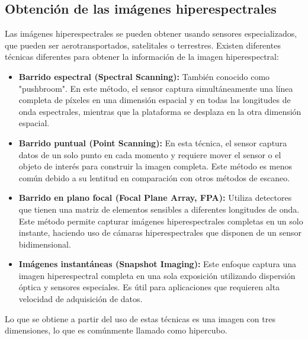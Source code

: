 \subsection{Obtención de las imágenes hiperespectrales}
Las imágenes hiperespectrales se pueden obtener usando sensores especializados, que pueden ser aerotransportados, satelitales o terrestres.
Existen diferentes técnicas diferentes para obtener la información de la imagen hiperespectral:
\begin{itemize}
    \item \textbf{Barrido espectral (Spectral Scanning):} También conocido como "pushbroom". En este método, el sensor captura simultáneamente una línea completa de píxeles en una dimensión espacial y en todas las longitudes de onda espectrales, mientras que la plataforma se desplaza en la otra dimensión espacial.

    \item \textbf{Barrido puntual (Point Scanning):} En esta técnica, el sensor captura datos de un solo punto en cada momento y requiere mover el sensor o el objeto de interés para construir la imagen completa. Este método es menos común debido a su lentitud en comparación con otros métodos de escaneo.
    
    \item \textbf{Barrido en plano focal (Focal Plane Array, FPA):} Utiliza detectores que tienen una matriz de elementos sensibles a diferentes longitudes de onda. Este método permite capturar imágenes hiperespectrales completas en un solo instante, haciendo uso de cámaras hiperespectrales que disponen de un sensor bidimensional.
    
    \item \textbf{Imágenes instantáneas (Snapshot Imaging):} Este enfoque captura una imagen hiperespectral completa en una sola exposición utilizando dispersión óptica y sensores especiales. Es útil para aplicaciones que requieren alta velocidad de adquisición de datos.
\end{itemize}
Lo que se obtiene a partir del uso de estas técnicas es una imagen con tres dimensiones, lo que es comúnmente llamado como hipercubo.



